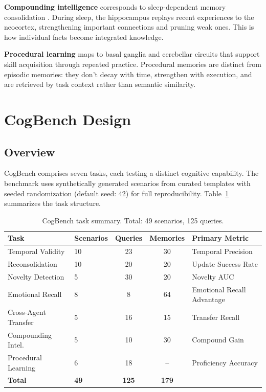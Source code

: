 \documentclass{article}
\begin{document}
\textbf{Compounding intelligence} corresponds to sleep-dependent memory consolidation \citep{diekelmann2010memory}. During sleep, the hippocampus replays recent experiences to the neocortex, strengthening important connections and pruning weak ones. This is how individual facts become integrated knowledge.

\textbf{Procedural learning} maps to basal ganglia and cerebellar circuits \citep{squire2004memory} that support skill acquisition through repeated practice. Procedural memories are distinct from episodic memories: they don't decay with time, strengthen with execution, and are retrieved by task context rather than semantic similarity.

\section{CogBench Design}
\label{sec:design}

\subsection{Overview}

CogBench comprises seven tasks, each testing a distinct cognitive capability. The benchmark uses synthetically generated scenarios from curated templates with seeded randomization (default seed: 42) for full reproducibility. Table~\ref{tab:tasks} summarizes the task structure.

\begin{table}[t]
\centering
\caption{CogBench task summary. Total: 49 scenarios, 125 queries.}
\label{tab:tasks}
\small
\begin{tabular}{llccl}
\toprule
\textbf{Task} & \textbf{Scenarios} & \textbf{Queries} & \textbf{Memories} & \textbf{Primary Metric} \\
\midrule
Temporal Validity & 10 & 23 & 30 & Temporal Precision \\
Reconsolidation & 10 & 20 & 20 & Update Success Rate \\
Novelty Detection & 5 & 30 & 20 & Novelty AUC \\
Emotional Recall & 8 & 8 & 64 & Emotional Recall Advantage \\
Cross-Agent Transfer & 5 & 16 & 15 & Transfer Recall \\
Compounding Intel. & 5 & 10 & 30 & Compound Gain \\
Procedural Learning & 6 & 18 & -- & Proficiency Accuracy \\
\midrule
\textbf{Total} & \textbf{49} & \textbf{125} & \textbf{179} & \\
\bottomrule
\end{tabular}
\end{table}
\end{document}
